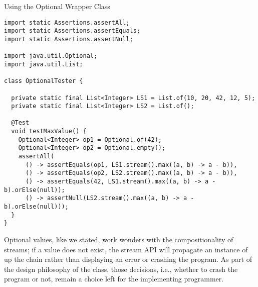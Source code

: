 
\begin{cl}[]{Using the Optional Wrapper Class}
\begin{lstlisting}[language=MyJava]
import static Assertions.assertAll;
import static Assertions.assertEquals;
import static Assertions.assertNull;

import java.util.Optional;
import java.util.List;

class OptionalTester {

  private static final List<Integer> LS1 = List.of(10, 20, 42, 12, 5);
  private static final List<Integer> LS2 = List.of();

  @Test
  void testMaxValue() {
    Optional<Integer> op1 = Optional.of(42);
    Optional<Integer> op2 = Optional.empty();
    assertAll(
      () -> assertEquals(op1, LS1.stream().max((a, b) -> a - b)),
      () -> assertEquals(op2, LS2.stream().max((a, b) -> a - b)),
      () -> assertEquals(42, LS1.stream().max((a, b) -> a - b).orElse(null));
      () -> assertNull(LS2.stream().max((a, b) -> a - b).orElse(null)));
  }
}
\end{lstlisting}
\end{cl}

Optional values, like we stated, work wonders with the compositionality of streams; if a value does not exist, the stream API will propagate an  instance of  up the chain rather than displaying an error or crashing the program. As part of the design philosophy of the class, those decisions, i.e., whether to crash the program or not, remain a choice left for the implementing programmer.